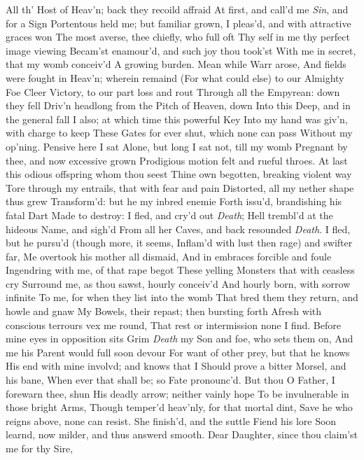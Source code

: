 \documentclass[11pt]{book}
\newcounter {first}
\newcounter {last}
\begin{document}
All th' Host of Heav'n; back they recoild affraid 
At first, and call'd me \textit{Sin}, and for a Sign 
Portentous held me; but familiar grown, 
I pleas'd, and with attractive graces won 
The most averse, thee chiefly, who full oft 
Thy self in me thy perfect image viewing 
Becam'st enamour'd, and such joy thou took'st 
With me in secret, that my womb conceiv'd 
A growing burden.  Mean while Warr arose, 
And fields were fought in Heav'n; wherein remaind 
(For what could else) to our Almighty Foe 
Cleer Victory, to our part loss and rout 
Through all the Empyrean: down they fell 
Driv'n headlong from the Pitch of Heaven, down 
Into this Deep, and in the general fall 
I also; at which time this powerful Key 
Into my hand was giv'n, with charge to keep 
These Gates for ever shut, which none can pass 
Without my op'ning.  Pensive here I sat 
Alone, but long I sat not, till my womb 
Pregnant by thee, and now excessive grown 
Prodigious motion felt and rueful throes. 
At last this odious offspring whom thou seest 
Thine own begotten, breaking violent way 
Tore through my entrails, that with fear and pain 
Distorted, all my nether shape thus grew 
Transform'd: but he my inbred enemie 
Forth issu'd, brandishing his fatal Dart 
Made to destroy: I fled, and cry'd out \textit{Death}; 
Hell trembl'd at the hideous Name, and sigh'd 
From all her Caves, and back resounded \textit{Death}. 
I fled, but he pursu'd (though more, it seems, 
Inflam'd with lust then rage) and swifter far, 
Me overtook his mother all dismaid, 
And in embraces forcible and foule 
Ingendring with me, of that rape begot 
These yelling Monsters that with ceasless cry 
Surround me, as thou sawst, hourly conceiv'd 
And hourly born, with sorrow infinite 
To me, for when they list into the womb 
That bred them they return, and howle and gnaw 
My Bowels, their repast; then bursting forth 
Afresh with conscious terrours vex me round, 
That rest or intermission none I find. 
Before mine eyes in opposition sits 
Grim \textit{Death} my Son and foe, who sets them on, 
And me his Parent would full soon devour 
For want of other prey, but that he knows 
His end with mine involvd; and knows that I 
Should prove a bitter Morsel, and his bane, 
When ever that shall be; so Fate pronounc'd. 
But thou O Father, I forewarn thee, shun 
His deadly arrow; neither vainly hope 
To be invulnerable in those bright Arms, 
Though temper'd heav'nly, for that mortal dint, 
Save he who reigns above, none can resist. 
\quad She finish'd, and the suttle Fiend his lore 
Soon learnd, now milder, and thus answerd smooth. 
Dear Daughter, since thou claim'st me for thy Sire, 
\end{document}
